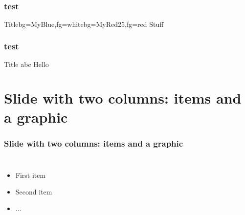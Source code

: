 \documentclass[aspectratio=169]{beamer}
\begin{document}
\begin{frame}
\frametitle{test}
 

\begin{variableblock}{Title}{bg=MyBlue,fg=white}{bg=MyRed25,fg=red}
  Stuff
\end{variableblock}
\end{frame}


\begin{frame}
\frametitle{test}
\begin{block}{Title}
abc Hello
\end{block}
\end{frame}


\section{Slide with two columns: items and a graphic}

\begin{frame}
  \frametitle{Slide with two columns: items and a graphic}   %
  \begin{columns}[c]
  \column{2in}  %
  \begin{itemize}
  \item<1-> First item
  \item<2-> Second item
  \item<3-> ...
  \end{itemize}
  \column{2in}
  \end{columns}
\end{frame}
\end{document}
